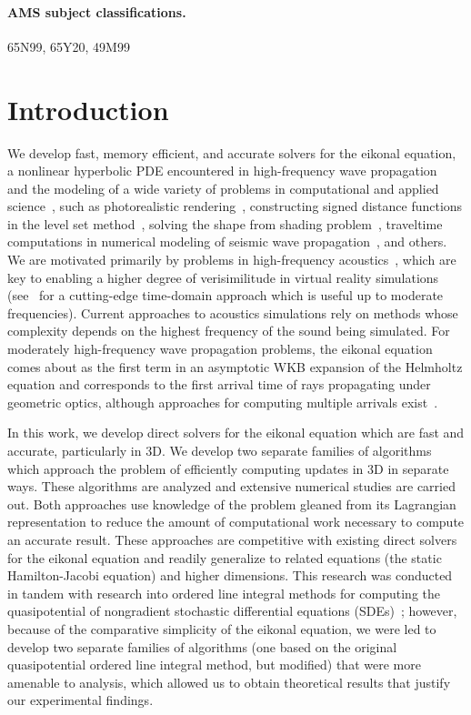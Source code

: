 \documentclass{article}
\begin{document}
\paragraph{AMS subject classifications.} 65N99, 65Y20, 49M99

\section{Introduction}\label{sec:introduction}

We develop fast, memory efficient, and accurate solvers for the
eikonal equation, a nonlinear hyperbolic PDE encountered in
high-frequency wave propagation~\cite{engquist2003computational} and
the modeling of a wide variety of problems in computational and
applied science~\cite{sethian1999level}, such as photorealistic
rendering~\cite{ihrke2007eikonal}, constructing signed distance
functions in the level set method~\cite{osher2006level}, solving the
shape from shading
problem~\cite{kimmel2001optimal,prados2006shape,durou2008numerical},
traveltime computations in numerical modeling of seismic wave
propagation~\cite{sethian19993,popovici20023,kim20023,van1991upwind,vidale1990finite},
and others. We are motivated primarily by problems in high-frequency
acoustics~\cite{prislan2016ray}, which are key to enabling a higher
degree of verisimilitude in virtual reality simulations
(see~\cite{raghuvanshi2014parametric,raghuvanshi2018parametric} for a
cutting-edge time-domain approach which is useful up to moderate
frequencies). Current approaches to acoustics simulations rely on
methods whose complexity depends on the highest frequency of the sound
being simulated. For moderately high-frequency wave propagation
problems, the eikonal equation comes about as the first term in an
asymptotic WKB expansion of the Helmholtz equation and corresponds to
the first arrival time of rays propagating under geometric optics,
although approaches for computing multiple arrivals
exist~\cite{fomel2002fast}.

In this work, we develop direct solvers for the eikonal equation which
are fast and accurate, particularly in 3D. We develop two separate
families of algorithms which approach the problem of efficiently
computing updates in 3D in separate ways. These algorithms are
analyzed and extensive numerical studies are carried out. Both
approaches use knowledge of the problem gleaned from its Lagrangian
representation to reduce the amount of computational work necessary to
compute an accurate result. These approaches are competitive with
existing direct solvers for the eikonal equation and readily
generalize to related equations (the static Hamilton-Jacobi equation)
and higher dimensions. This research was conducted in tandem with
research into ordered line integral methods for computing the
quasipotential of nongradient stochastic differential equations
(SDEs)~\cite{dahiya2017ordered,dahiya2018ordered,yang2019computing};
however, because of the comparative simplicity of the eikonal
equation, we were led to develop two separate families of algorithms
(one based on the original quasipotential ordered line integral
method, but modified) that were more amenable to analysis, which
allowed us to obtain theoretical results that justify our experimental
findings.
\end{document}

